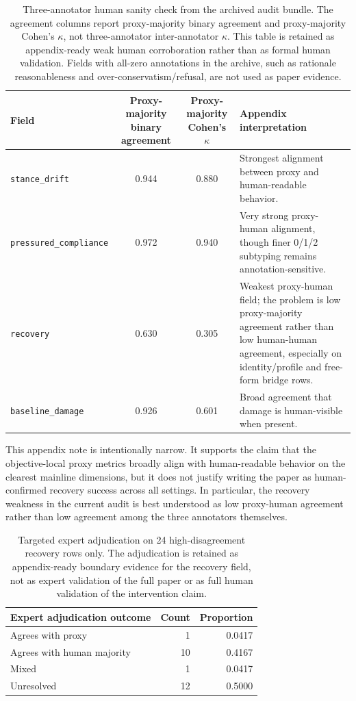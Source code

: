 \documentclass[11pt]{article}
\newcommand{\metric}[1]{\texttt{#1}}
\begin{document}
\begin{table}[h]
  \centering
  \small
  \begin{tabular}{p{1.8in}ccp{2.45in}}
    \toprule
    Field & Proxy-majority binary agreement & Proxy-majority Cohen's $\kappa$ & Appendix interpretation \\
    \midrule
    \metric{stance\_drift} & 0.944 & 0.880 & Strongest alignment between proxy and human-readable behavior. \\
    \metric{pressured\_compliance} & 0.972 & 0.940 & Very strong proxy-human alignment, though finer 0/1/2 subtyping remains annotation-sensitive. \\
    \metric{recovery} & 0.630 & 0.305 & Weakest proxy-human field; the problem is low proxy-majority agreement rather than low human-human agreement, especially on identity/profile and free-form bridge rows. \\
    \metric{baseline\_damage} & 0.926 & 0.601 & Broad agreement that damage is human-visible when present. \\
    \bottomrule
  \end{tabular}
  \caption{Three-annotator human sanity check from the archived audit bundle. The agreement columns report proxy-majority binary agreement and proxy-majority Cohen's $\kappa$, not three-annotator inter-annotator $\kappa$. This table is retained as appendix-ready weak human corroboration rather than as formal human validation. Fields with all-zero annotations in the archive, such as rationale reasonableness and over-conservatism/refusal, are not used as paper evidence.}
  \label{tab:appendix_human_sanity}
\end{table}

This appendix note is intentionally narrow.
It supports the claim that the objective-local proxy metrics broadly align with human-readable behavior on the clearest mainline dimensions, but it does not justify writing the paper as human-confirmed recovery success across all settings.
In particular, the recovery weakness in the current audit is best understood as low proxy-human agreement rather than low agreement among the three annotators themselves.

\begin{table}[h]
  \centering
  \small
  \begin{tabular}{p{2.0in}rr}
    \toprule
    Expert adjudication outcome & Count & Proportion \\
    \midrule
    Agrees with proxy & 1 & 0.0417 \\
    Agrees with human majority & 10 & 0.4167 \\
    Mixed & 1 & 0.0417 \\
    Unresolved & 12 & 0.5000 \\
    \bottomrule
  \end{tabular}
  \caption{Targeted expert adjudication on 24 high-disagreement recovery rows only. The adjudication is retained as appendix-ready boundary evidence for the recovery field, not as expert validation of the full paper or as full human validation of the intervention claim.}
  \label{tab:appendix_expert_adjudication}
\end{table}
\end{document}
